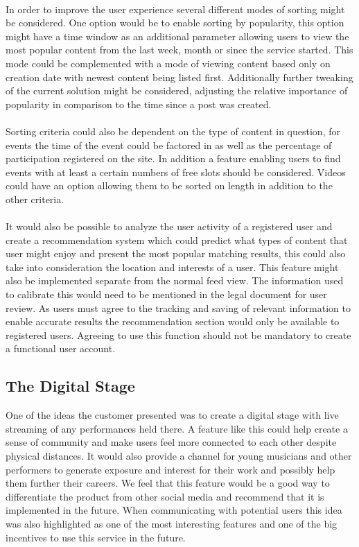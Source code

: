 \paragraph{} In order to improve the user experience several different modes of sorting might be considered. One option would be to enable sorting by popularity, this option might have a time window as an additional parameter allowing users to view the most popular content from the last week, month or since the service started. This mode could be complemented with a mode of viewing content based only on creation date with newest content being listed first. Additionally further tweaking of the current solution might be considered, adjusting the relative importance of popularity in comparison to the time since a post was created.
\paragraph{} Sorting criteria could also be dependent on the type of content in question, for events the time of the event could be factored in as well as the percentage of participation registered on the site. In addition a feature enabling users to find events with at least a certain numbers of free slots should be considered. Videos could have an option allowing them to be sorted on length in addition to the other criteria.
\paragraph{} It would also be possible to analyze the user activity of a registered user and create a recommendation system which could predict what types of  content that user might enjoy and present the most popular matching results, this could also take into consideration the location and interests of a user. This feature might also be implemented separate from the normal feed view. The information used to calibrate this would need to be mentioned in the legal document for user review. As users must agree to the tracking and saving of relevant information to enable accurate results the recommendation section would only be available to registered users. Agreeing to use this function should not be mandatory to create a functional user account.

\subsection{The Digital Stage} 
\label{subsec:FurtherImprovementsStage}
One of the ideas the customer presented was to create a digital stage with live streaming of any performances held there. A feature like this could help create a sense of community and make users feel more connected to each other despite physical distances. It would also provide a channel for young musicians and other performers to generate exposure and interest for their work and possibly help them further their careers. We feel that this feature would be a good way to differentiate the product from other social media and recommend that it is implemented in the future. When communicating with potential users this idea was also highlighted as one of the most interesting features and one of the big incentives to use this service in the future. 
